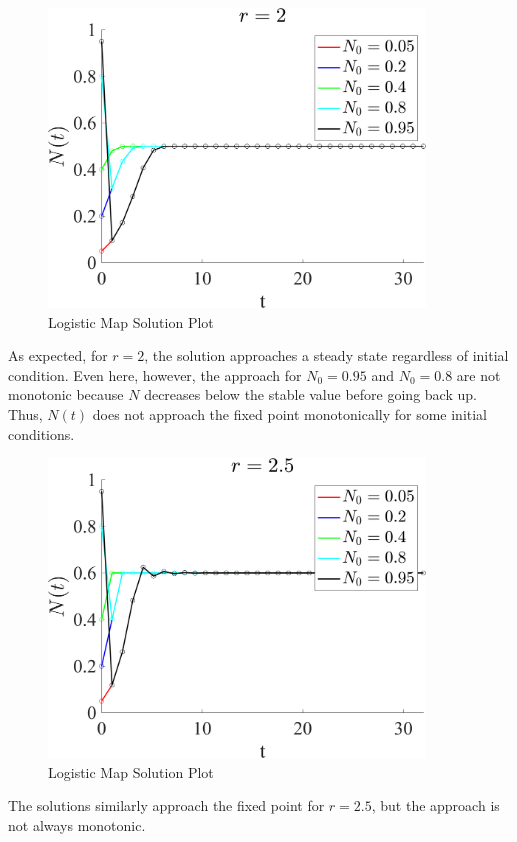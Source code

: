 \documentclass[11pt]{article}
\begin{document}
\begin{figure}[H]
\centering
\includegraphics[width=10cm]{Logistic_map_r_2}
\caption{Logistic Map Solution Plot}
\end{figure}
As expected, for $r = 2$, the solution approaches a steady state regardless of initial condition. Even here, however, the approach for $N_0 = 0.95$ and $N_0=0.8$ are not monotonic because $N$ decreases below the stable value before going back up. Thus, $N(t)$ does not approach the fixed point monotonically for some initial conditions.

\begin{figure}[H]
\centering
\includegraphics[width=10cm]{Logistic_map_r_2_5}
\caption{Logistic Map Solution Plot}
\end{figure}
The solutions similarly approach the fixed point for $r = 2.5$, but the approach is not always monotonic.
\end{document}
